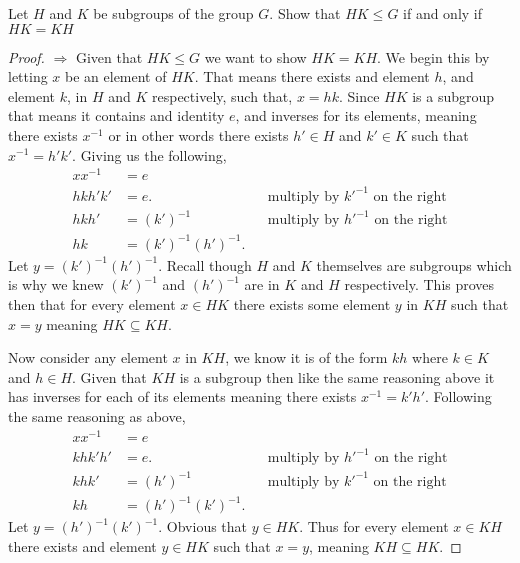 \documentclass[11pt]{article}
\newenvironment{problem}[2][Problem\!]{\begin{trivlist}
\item[\hskip \labelsep {\bfseries #1}\hskip \labelsep {\bfseries #2}]}{\end{trivlist}}
\renewcommand{\leq}{\leqslant}
\begin{document}
 \begin{tcolorbox}
     \begin{problem}{2.4} 
        Let $H$ and $K$ be subgroups of the group $G$. Show that $HK \leq G$ if and only if $HK = KH$ 
     \end{problem}
 \end{tcolorbox}
 \begin{proof}
     $\Rightarrow$ Given that $HK \leq G$ we want to show $HK = KH$. We begin this by letting $x$ be an element of $HK$. That means there exists and element $h$, and element $k$, in $H$ and $K$ respectively, such that, $x = hk$. Since $HK$ is a subgroup that means it contains and identity $e$, and inverses for its elements, meaning there exists $x^{-1}$ or in other words there exists $h'\in H$ and $k'\in K$ such that $x^{-1} = h'k'$. Giving us the following,
     \begin{align*}
         xx^{-1} &= e \\
         hkh'k' &= e. && \text{multiply by $k'^{-1}$ on the right} \\
         hkh' &= (k')^{-1} && \text{multiply by $h'^{-1}$ on the right} \\
         hk &= (k')^{-1}(h')^{-1}. 
     \end{align*}
     Let $y = (k')^{-1}(h')^{-1}$.
     Recall though $H$ and $K$ themselves are subgroups which is why we knew $(k')^{-1}$ and $(h')^{-1}$ are in $K$ and $H$ respectively. This proves then that for every element $x\in HK$ there exists some element $y$ in $KH$ such that $x = y$ meaning $HK \subseteq KH$. 

     Now consider any element $x$ in $KH$, we know it is of the form $kh$ where $k\in K$ and $h\in H$. Given that $KH$ is a subgroup then like the same reasoning above it has inverses for each of its elements meaning there exists $x^{-1} = k'h'$. Following the same reasoning as above,
     \begin{align*}
        xx^{-1} &= e \\
        khk'h' &= e. && \text{multiply by $h'^{-1}$ on the right} \\
        khk' &= (h')^{-1} && \text{multiply by $k'^{-1}$ on the right} \\
        kh &= (h')^{-1}(k')^{-1}.
     \end{align*}
     Let $y = (h')^{-1}(k')^{-1}$. Obvious that $y \in HK$. Thus for every element $x \in KH$ there exists and element $y\in HK$ such that $x = y$, meaning $KH \subseteq HK$. 


\end{proof}
\end{document}
